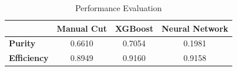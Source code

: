 \begin{table}[htp]
	\centering
	\small
	\begin{tabular}{lccc}
		\toprule
		& \textbf{Manual Cut} & \textbf{XGBoost} & \textbf{Neural Network} \\
		\midrule
		\textbf{Purity} & 0.6610 & 0.7054 & 0.1981 \\
		\textbf{Efficiency} & 0.8949 & 0.9160 & 0.9158 \\
		\bottomrule
	\end{tabular}
	\caption{Performance Evaluation}
	\label{tab:eff_pur}
\end{table}











